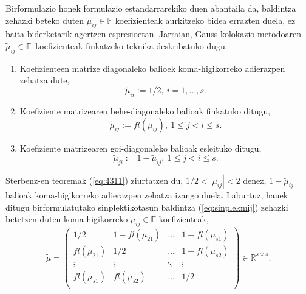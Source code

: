 Birformulazio honek formulazio estandarrarekiko duen abantaila da,  baldintza zehazki beteko duten $\tilde \mu_{ij} \in \mathbb{F}$ koefizienteak aurkitzeko bidea errazten duela, ez baita biderketarik agertzen espresioetan. Jarraian, Gauss kolokazio metodoaren $\tilde{\mu}_{ij} \in \mathbb{F}$~koefizienteak finkatzeko teknika deskribatuko dugu.  
\begin{enumerate}
\item Koefizienteen matrize diagonaleko balioek koma-higikorreko adierazpen zehatza dute,
\begin{equation*}
\tilde{\mu}_{ii}:=1/2, \ i=1,\dots,s.
\end{equation*}

\item Koefiziente matrizearen behe-diagonaleko balioak finkatuko ditugu,
\begin{equation*}
 \tilde{\mu}_{ij}:=fl(\mu_{ij}), \ 1 \leqslant j < i \leqslant s.
\end{equation*}

\item Koefiziente matrizearen goi-diagonaleko balioak esleituko ditugu,
\begin{equation*}
\tilde{\mu}_{ji}:=1-\tilde{\mu}_{ij} , \ 1 \leqslant j < i \leqslant s.
\end{equation*}

\end{enumerate}
Sterbenz-en teoremak (\ref{eq:4311}) ziurtatzen du, $1/2 < |\mu_{ij}| <2$ denez, $1-\tilde{\mu}_{ij}$ balioak koma-higikorreko adierazpen zehatza izango duela. Laburtuz, hauek ditugu birformulatutako sinplektikotasun baldintza (\ref{eq:sinplekmij}) zehazki betetzen duten koma-higikorreko $\tilde{\mu}_{ij}\in \mathbb{F}$ koefizienteak,   
\begin{equation}
\tilde{\mu}=\left(\begin{array}{cccc}
    1/2       & 1-fl(\mu_{21}) & \dots & 1-fl(\mu_{s1})      \\
    fl(\mu_{21})      & 1/2    & \dots & 1-fl(\mu_{s2})      \\
    \vdots            & \vdots         & \ddots      & \vdots      \\
    fl(\mu_{s1})      & fl(\mu_{s2})   & \dots & 1/2          \\ 
     \end{array}\right) \in \mathbb{R}^{s \times s}.
\end{equation}

